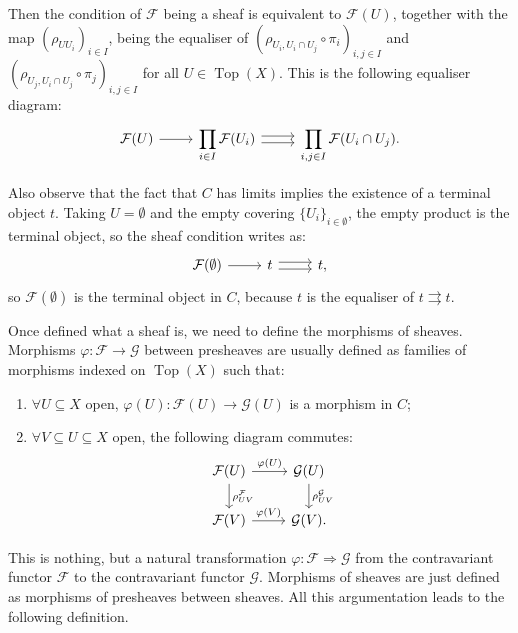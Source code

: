 \documentclass{report}
\DeclareMathOperator{\Top}{Top}
\theoremstyle{definition}
\begin{document}
Then the condition of $\mathcal{F}$ being a sheaf is equivalent to $\mathcal{F}(U)$, together with the map $(\rho_{UU_i})_{i\in I}$, being the equaliser of $(\rho_{U_i,U_i\cap U_j}\circ\pi_i)_{i,j\in I}$ and $(\rho_{U_j,U_i\cap U_j}\circ\pi_j)_{i,j\in I}$ for all $U\in\Top(X)$. This is the following equaliser diagram:
\begin{equation}
\label{Equ:sheaf_equaliser}
\begin{tikzcd}
\mathcal{F}(U)\arrow[r]&\displaystyle{\prod_{i\in I}\mathcal{F}(U_i)}\arrow[r,shift left]\arrow[r,shift right]&\displaystyle{\prod_{i,j\in I}\mathcal{F}(U_i\cap U_j)}.
\end{tikzcd}
\end{equation}

Also observe that the fact that $C$ has limits implies the existence of a terminal object $t$. Taking $U=\emptyset$ and the empty covering $\{U_i\}_{i\in\emptyset}$, the empty product is the terminal object, so the sheaf condition writes as:
\[
\begin{tikzcd}
\mathcal{F}(\emptyset)\arrow[r]&t\arrow[r,shift left]\arrow[r,shift right]&t,
\end{tikzcd}
\]
so $\mathcal{F}(\emptyset)$ is the terminal object in $C$, because $t$ is the equaliser of $t\rightrightarrows t$.
\vspace{2mm}

Once defined what a sheaf is, we need to define the morphisms of sheaves. Morphisms $\varphi:\mathcal{F}\rightarrow\mathcal{G}$ between presheaves are usually defined as families of morphisms indexed on $\Top(X)$ such that:
\begin{enumerate}
\item $\forall U\subseteq X$ open, $\varphi(U):\mathcal{F}(U)\rightarrow\mathcal{G}(U)$ is a morphism in $C$;
\item $\forall V\subseteq U\subseteq X$ open, the following diagram commutes:
\[
\begin{tikzcd}
\mathcal{F}(U)\arrow[r,"\varphi(U)"]\arrow[d,"\rho_{UV}^{\mathcal{F}}"]&\mathcal{G}(U)\arrow[d,"\rho_{UV}^{\mathcal{G}}"]\\
\mathcal{F}(V)\arrow[r,"\varphi(V)"]&\mathcal{G}(V).
\end{tikzcd}
\]
\end{enumerate}

This is nothing, but a natural transformation $\varphi:\mathcal{F}\Rightarrow\mathcal{G}$ from the contravariant functor $\mathcal{F}$ to the contravariant functor $\mathcal{G}$. Morphisms of sheaves are just defined as morphisms of presheaves between sheaves. All this argumentation leads to the following definition.
\end{document}
